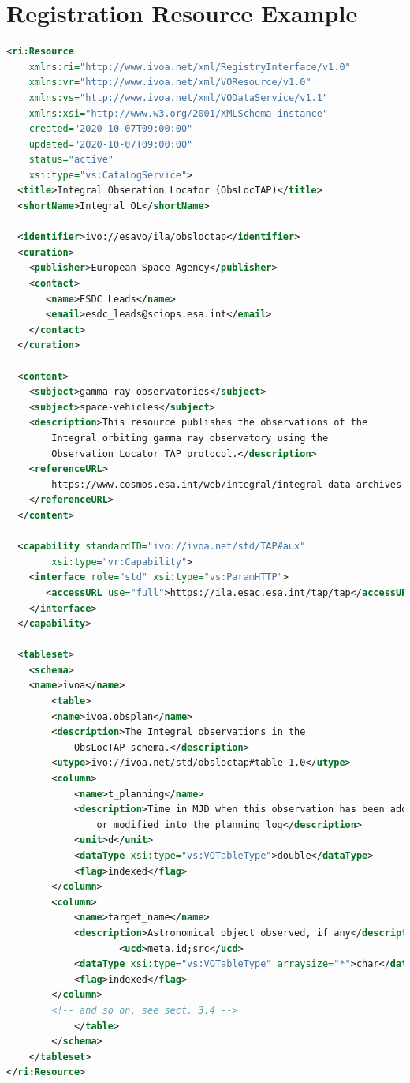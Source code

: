 \documentclass[11pt,a4paper]{ivoa}
\begin{document}
\section{Registration Resource Example}
\begin{lstlisting}[language=XML]
<ri:Resource
	xmlns:ri="http://www.ivoa.net/xml/RegistryInterface/v1.0"
	xmlns:vr="http://www.ivoa.net/xml/VOResource/v1.0"
	xmlns:vs="http://www.ivoa.net/xml/VODataService/v1.1"
	xmlns:xsi="http://www.w3.org/2001/XMLSchema-instance"
	created="2020-10-07T09:00:00"
	updated="2020-10-07T09:00:00"
	status="active"
	xsi:type="vs:CatalogService">
  <title>Integral Obseration Locator (ObsLocTAP)</title>
  <shortName>Integral OL</shortName>

  <identifier>ivo://esavo/ila/obsloctap</identifier>
  <curation>
    <publisher>European Space Agency</publisher>
    <contact>
       <name>ESDC Leads</name>
       <email>esdc_leads@sciops.esa.int</email>
    </contact>
  </curation>

  <content>
    <subject>gamma-ray-observatories</subject>
    <subject>space-vehicles</subject>
    <description>This resource publishes the observations of the
    	Integral orbiting gamma ray observatory using the
    	Observation Locator TAP protocol.</description>
    <referenceURL>
    	https://www.cosmos.esa.int/web/integral/integral-data-archives
    </referenceURL>
  </content>

  <capability standardID="ivo://ivoa.net/std/TAP#aux"
  		xsi:type="vr:Capability">
    <interface role="std" xsi:type="vs:ParamHTTP">
       <accessURL use="full">https://ila.esac.esa.int/tap/tap</accessURL>
    </interface>
  </capability>

  <tableset>
    <schema>
    <name>ivoa</name>
     	<table>
        <name>ivoa.obsplan</name>
        <description>The Integral observations in the
         	ObsLocTAP schema.</description>
        <utype>ivo://ivoa.net/std/obsloctap#table-1.0</utype>
        <column>
         	<name>t_planning</name>
         	<description>Time in MJD when this observation has been added
         		or modified into the planning log</description>
         	<unit>d</unit>
         	<dataType xsi:type="vs:VOTableType">double</dataType>
        	<flag>indexed</flag>
        </column>
        <column>
         	<name>target_name</name>
         	<description>Astronomical object observed, if any</description>
					<ucd>meta.id;src</ucd>
        	<dataType xsi:type="vs:VOTableType" arraysize="*">char</dataType>
        	<flag>indexed</flag>
        </column>
        <!-- and so on, see sect. 3.4 -->
			</table>
		</schema>
	</tableset>
</ri:Resource>

\end{lstlisting}
\end{document}
